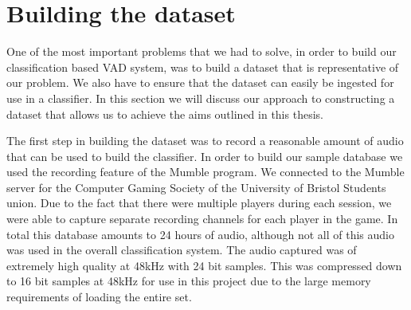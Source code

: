 \documentclass[ %
                    author={Sam Phippen},
                supervisor={Dr. Rafal Bogacz},
                     title={Real time voice activity detectors in noisy personal computing environments},
                  subtitle={},
                    degree={MEng},
                      year={2012} ]{thesis}
\begin{document}
%
%
%

\section{Building the dataset}

One of the most important problems that we had to solve, in order to build our
classification based VAD system, was to build a dataset that is representative
of our problem. We also have to ensure that the dataset can easily be ingested
for use in a classifier. In this section we will discuss our approach to
constructing a dataset that allows us to achieve the aims outlined in this
thesis.

The first step in building the dataset was to record a reasonable amount of
audio that can be used to build the classifier. In order to build our sample
database we used the recording feature of the Mumble\cite{mumble} program. We
connected to the Mumble server for the Computer Gaming Society of the University of
Bristol Students union. Due to the fact that there were multiple players during
each session, we were able to capture separate recording channels for each
player in the game. In total this database amounts to 24 hours of audio,
although not all of this audio was used in the overall classification system.
The audio captured was of extremely high quality at 48kHz with 24 bit samples.
This was compressed down to 16 bit samples at 48kHz for use in this project due
to the large memory requirements of loading the entire set.
\end{document}
